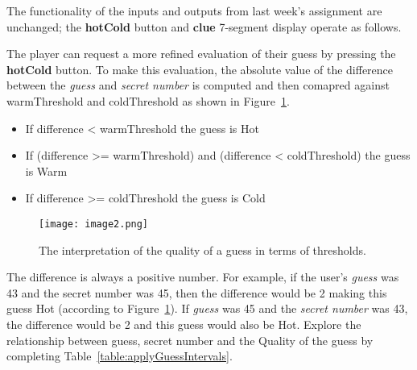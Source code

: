 The functionality of the inputs and outputs from last week's assignment
are unchanged; the \textbf{hotCold} button and \textbf{clue} 7-segment
display operate as follows.

The player can request a more refined evaluation of their guess by
pressing the \textbf{hotCold} button. To make this evaluation, the
absolute value of the difference between the \emph{guess} and
\emph{secret number} is computed and then comapred against warmThreshold
and coldThreshold as shown in Figure~\ref{fig:guessThreshold}.

\begin{itemize}
\item
  If difference \textless{} warmThreshold the guess is Hot
\item
  If (difference \textgreater= warmThreshold) and (difference
  \textless{} coldThreshold) the guess is Warm
\item
  If difference \textgreater= coldThreshold the guess is Cold
\end{itemize}

\begin{figure}[ht]
\texttt{[image:  image2.png]}
\caption{The interpretation of the quality of a guess in terms of thresholds.}
\label{fig:guessThreshold}
\end{figure}

The difference is always a positive number. For example, if the user's
\emph{guess} was 43 and the secret number was 45, then the difference
would be 2 making this guess Hot (according to Figure~\ref{fig:guessThreshold}). If
\emph{guess} was 45 and the \emph{secret number} was 43, the difference
would be 2 and this guess would also be Hot. Explore the relationship
between guess, secret number and the Quality of the guess by completing
Table~\ref{table:applyGuessIntervals}.


